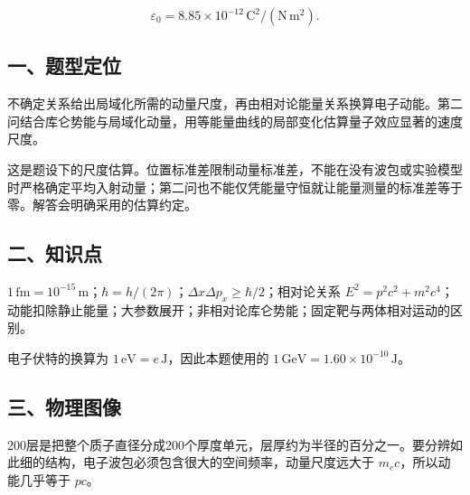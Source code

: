 \documentclass[12pt,a4paper,fontset=fandol]{ctexart}
\begin{document}
\[\varepsilon_0=8.85\times10^{-12}\,\mathrm{C^2/(N\,m^2)}.\]

\subsection{一、题型定位}\label{ux4e00ux9898ux578bux5b9aux4f4d-3}

不确定关系给出局域化所需的动量尺度，再由相对论能量关系换算电子动能。第二问结合库仑势能与局域化动量，用等能量曲线的局部变化估算量子效应显著的速度尺度。

这是题设下的尺度估算。位置标准差限制动量标准差，不能在没有波包或实验模型时严格确定平均入射动量；第二问也不能仅凭能量守恒就让能量测量的标准差等于零。解答会明确采用的估算约定。

\subsection{二、知识点}\label{ux4e8cux77e5ux8bc6ux70b9-3}

\(1\,\mathrm{fm}=10^{-15}\,\mathrm m\)；\(\hbar=h/(2\pi)\)；\(\Delta x\Delta p_x\ge\hbar/2\)；相对论关系
\(E^2=p^2c^2+m^2c^4\)；动能扣除静止能量；大参数展开；非相对论库仑势能；固定靶与两体相对运动的区别。

电子伏特的换算为 \(1\,\mathrm{eV}=e\,\mathrm J\)，因此本题使用的
\(1\,\mathrm{GeV}=1.60\times10^{-10}\,\mathrm J\)。

\subsection{三、物理图像}\label{ux4e09ux7269ux7406ux56feux50cf-3}

200层是把整个质子直径分成200个厚度单元，层厚约为半径的百分之一。要分辨如此细的结构，电子波包必须包含很大的空间频率，动量尺度远大于
\(m_ec\)，所以动能几乎等于 \(pc\)。

\begin{center}
\begin{minipage}{\linewidth}
\centering\begingroup
{}
\ifdim\wd\diagrambox>.88\linewidth
\sbox{\diagrambox}{\resizebox{.88\linewidth}{!}{\usebox{\diagrambox}}}
\fi
\ifdim\ht\diagrambox>.40\textheight
\resizebox{!}{.40\textheight}{\usebox{\diagrambox}}
\else\usebox{\diagrambox}\fi
\par{}
\endgroup\end{minipage}
\end{center}
\end{document}
